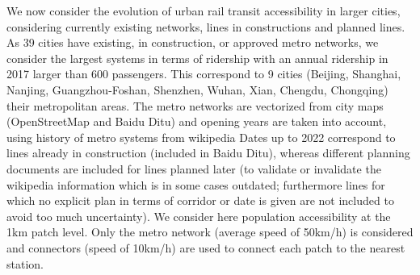 We now consider the evolution of urban rail transit accessibility in larger cities, considering currently existing networks, lines in constructions and planned lines. As 39 cities have existing, in construction, or approved metro networks, we consider the largest systems in terms of ridership with an annual ridership in 2017 larger than 600  passengers. This correspond to 9 cities (Beijing, Shanghai, Nanjing, Guangzhou-Foshan, Shenzhen, Wuhan, Xian, Chengdu, Chongqing)  their metropolitan areas. The metro networks are vectorized from city maps (OpenStreetMap and Baidu Ditu) and opening years are taken into account, using history of metro systems from wikipedia Dates up to 2022 correspond to lines already in construction (included in Baidu Ditu), whereas different planning documents are included for lines planned later (to validate or invalidate the wikipedia information which is in some cases outdated; furthermore lines for which no explicit plan in terms of corridor or date is given are not included to avoid too much uncertainty). We consider here population accessibility at the 1km patch level. Only the metro network (average speed of 50km/h) is considered and connectors (speed of 10km/h) are used to connect each patch to the nearest station.




